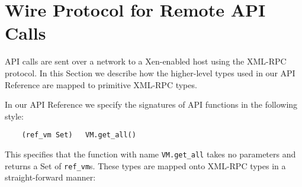 %
%
%
%

\section{Wire Protocol for Remote API Calls}

API calls are sent over a network to a Xen-enabled host using
the XML-RPC protocol. In this Section we describe how the
higher-level types used in our API Reference are mapped to
primitive XML-RPC types.

In our API Reference we specify the signatures of API functions in the following
style:
\begin{verbatim}
    (ref_vm Set)   VM.get_all()
\end{verbatim}
This specifies that the function with name {\tt VM.get\_all} takes
no parameters and returns a Set of {\tt ref\_vm}s.
These types are mapped onto XML-RPC types in a straight-forward manner:
